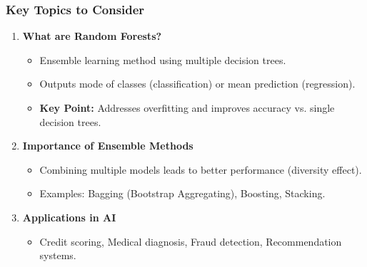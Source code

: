 \documentclass[aspectratio=169]{beamer}
\begin{document}
\begin{frame}[fragile]
  \frametitle{Key Topics to Consider}
  \begin{enumerate}
    \item \textbf{What are Random Forests?}
    \begin{itemize}
      \item Ensemble learning method using multiple decision trees. 
      \item Outputs mode of classes (classification) or mean prediction (regression).
      \item \textbf{Key Point:} Addresses overfitting and improves accuracy vs. single decision trees.
    \end{itemize}

    \item \textbf{Importance of Ensemble Methods}
    \begin{itemize}
      \item Combining multiple models leads to better performance (diversity effect).
      \item Examples: Bagging (Bootstrap Aggregating), Boosting, Stacking.
    \end{itemize}

    \item \textbf{Applications in AI}
    \begin{itemize}
      \item Credit scoring, Medical diagnosis, Fraud detection, Recommendation systems.
    \end{itemize}
  \end{enumerate}
\end{frame}
\end{document}
